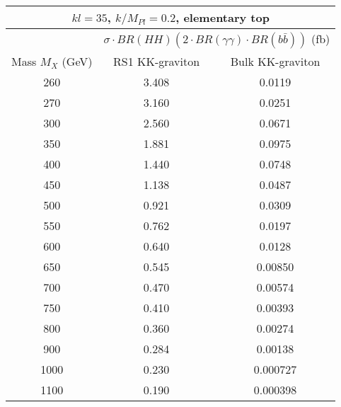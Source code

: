 \begin{tabular}{|c|cc|}
\hline
\multicolumn{3}{|c|}{ $kl = 35$, $k/M_{Pl} = 0.2$, elementary top }\\ \hline \hline
 & \multicolumn{2}{c|}{ $\sigma \cdot BR(HH) (2 \cdot BR(\gamma\gamma) \cdot BR(b\bar{b}))$ (fb) }\\ %
 Mass $M_X$ (GeV) & RS1 KK-graviton  & Bulk KK-graviton \\ \hline
260     & 3.408 & 0.0119 \\
270     & 3.160 & 0.0251 \\
300     & 2.560 & 0.0671 \\
350     & 1.881 & 0.0975 \\
400     & 1.440 & 0.0748 \\
450     & 1.138 & 0.0487 \\
500     & 0.921 & 0.0309 \\
550     & 0.762 & 0.0197 \\
600     & 0.640 & 0.0128 \\
650     & 0.545 & 0.00850 \\
700     & 0.470 & 0.00574 \\
750     & 0.410 & 0.00393 \\
800     & 0.360 & 0.00274 \\
900     & 0.284 & 0.00138 \\
1000    & 0.230 & 0.000727 \\
1100    & 0.190 & 0.000398 \\
\hline
\end{tabular}
